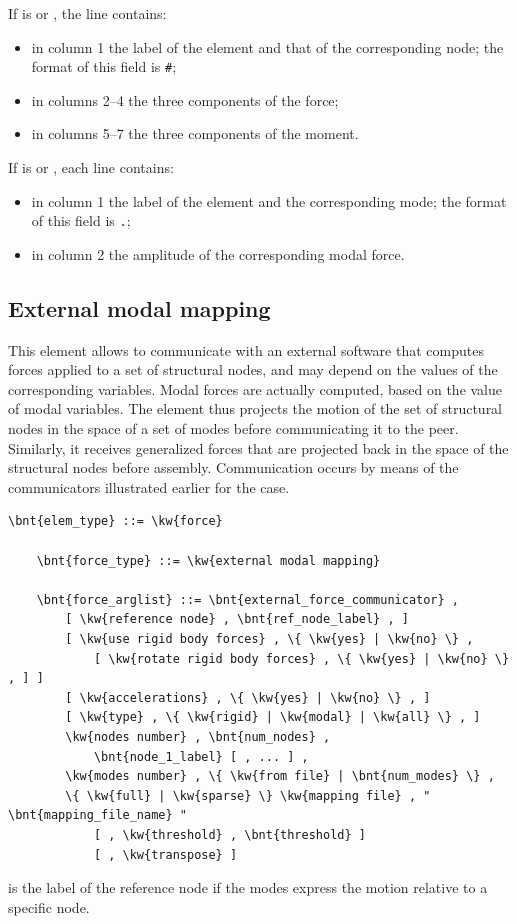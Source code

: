 If  is  or , the line contains:
\begin{itemize}
\item in column 1 the label of the element and that of the corresponding node;
	the format of this field is \texttt{\#};
\item in columns 2--4 the three components of the force;
\item in columns 5--7 the three components of the moment.
\end{itemize}
If  is  or , each line contains:
\begin{itemize}
\item in column 1 the label of the element and the corresponding mode;
	the format of this field is \texttt{.};
\item in column 2 the amplitude of the corresponding modal force.
\end{itemize}



\subsection{External modal mapping}
\label{sec:EL:FORCE:EXTERNAL:MODAL_MAPPING}
This element allows to communicate with an external software that computes
forces applied to a set of structural nodes,
and may depend on the values of the corresponding variables.
Modal forces are actually computed, based on the value of modal variables.
The element thus projects the motion of the set of structural nodes
in the space of a set of modes before communicating it to the peer.
Similarly, it receives generalized forces that are projected back
in the space of the structural nodes before assembly.
Communication occurs by means of the communicators illustrated earlier
for the  case.
\begin{Verbatim}[commandchars=\\\{\}]
    \bnt{elem_type} ::= \kw{force}

    \bnt{force_type} ::= \kw{external modal mapping}

    \bnt{force_arglist} ::= \bnt{external_force_communicator} ,
        [ \kw{reference node} , \bnt{ref_node_label} , ]
        [ \kw{use rigid body forces} , \{ \kw{yes} | \kw{no} \} ,
            [ \kw{rotate rigid body forces} , \{ \kw{yes} | \kw{no} \} , ] ]
        [ \kw{accelerations} , \{ \kw{yes} | \kw{no} \} , ]
        [ \kw{type} , \{ \kw{rigid} | \kw{modal} | \kw{all} \} , ]
        \kw{nodes number} , \bnt{num_nodes} ,
            \bnt{node_1_label} [ , ... ] ,
        \kw{modes number} , \{ \kw{from file} | \bnt{num_modes} \} ,
        \{ \kw{full} | \kw{sparse} \} \kw{mapping file} , " \bnt{mapping_file_name} "
            [ , \kw{threshold} , \bnt{threshold} ]
            [ , \kw{transpose} ]
\end{Verbatim}
 is the label of the reference node
if the modes express the motion relative to a specific node.

